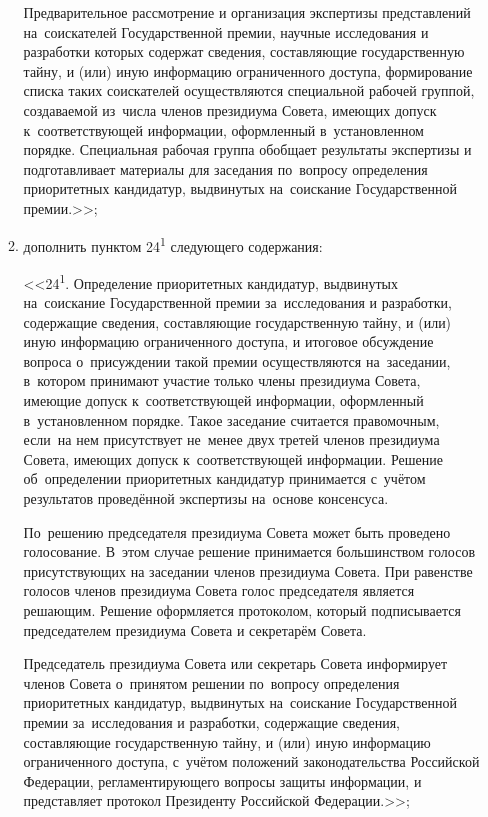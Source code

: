 \documentclass[14pt, a4paper]{extarticle}
\begin{document}
\begin{enumerate}
\begin{enumerate}[label=\asbuk*), ref=\asbuk*]
		Предварительное рассмотрение и организация экспертизы представлений на~соискателей Государственной премии, научные исследования и разработки которых содержат сведения, составляющие государственную тайну, и (или) иную информацию ограниченного доступа, формирование списка таких соискателей осуществляются специальной рабочей группой, создаваемой из~числа членов президиума Совета, имеющих допуск к~соответствующей информации, оформленный в~установленном порядке. Специальная рабочая группа обобщает результаты экспертизы и подготавливает материалы для заседания по~вопросу определения приоритетных кандидатур, выдвинутых на~соискание Государственной премии.>>;
		
		\item дополнить пунктом 24\textsuperscript{1} следующего содержания:
		
		<<24\textsuperscript{1}. Определение приоритетных кандидатур, выдвинутых на~соискание Государственной премии за~исследования и разработки, содержащие сведения, составляющие государственную тайну, и (или) иную информацию ограниченного доступа, и итоговое обсуждение вопроса о~присуждении такой премии осуществляются на~заседании, в~котором принимают участие только члены президиума Совета, имеющие допуск к~соответствующей информации, оформленный в~установленном порядке. Такое заседание считается правомочным, если~на нем присутствует не~менее двух третей членов президиума Совета, имеющих допуск к~соответствующей информации. Решение об~определении приоритетных кандидатур принимается с~учётом результатов проведённой экспертизы на~основе \mbox{консенсуса}.
		
		По~решению председателя президиума Совета может быть проведено голосование. В~этом случае решение принимается большинством голосов присутствующих на заседании членов президиума Совета. При равенстве голосов членов президиума Совета голос председателя является решающим. Решение оформляется протоколом, который подписывается председателем президиума Совета и секретарём Совета.
		
		Председатель президиума Совета или секретарь Совета информирует членов Совета о~принятом решении по~вопросу определения приоритетных кандидатур, выдвинутых на~соискание Государственной премии за~исследования и разработки, содержащие сведения, составляющие государственную тайну, и (или) иную информацию ограниченного доступа, с~учётом положений законодательства Российской Федерации, регламентирующего вопросы защиты информации, и представляет протокол Президенту Российской Федерации.>>;
		

\end{enumerate}
\end{enumerate}
\end{document}
